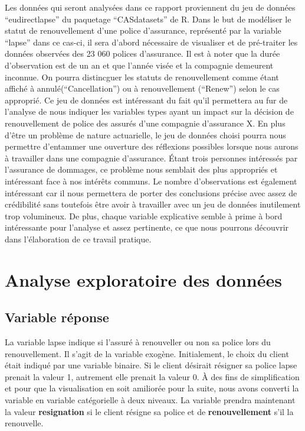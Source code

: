 \documentclass[
]{article}
\begin{document}
Les données qui seront analysées dans ce rapport proviennent du jeu de
données ``eudirectlapse'' du paquetage ``CASdatasets'' de R. Dans le but
de modéliser le statut de renouvellement d'une police d'assurance,
représenté par la variable ``lapse'' dans ce cas-ci, il sera d'abord
nécessaire de visualiser et de pré-traiter les données observées des 23
060 polices d'assurance. Il est à noter que la durée d'observation est
de un an et que l'année visée et la compagnie demeurent inconnue. On
pourra distincguer les statuts de renouvellement comme étant affiché à
annulé(``Cancellation'') ou à renouvellement (``Renew'') selon le cas
approprié. Ce jeu de données est intéressant du fait qu'il permettera au
fur de l'analyse de nous indiquer les variables types ayant un impact
sur la décision de renouvellement de police des assurés d'une compagnie
d'assurance X. En plus d'être un problème de nature actuarielle, le jeu
de données choisi pourra nous permettre d'entammer une ouverture des
réflexions possibles lorsque nous aurons à travailler dans une compagnie
d'assurance. Étant trois personnes intéressés par l'assurance de
dommages, ce problème nous semblait des plus appropriés et intéressant
face à nos intérêts communs. Le nombre d'observations est également
intéressant car il nous permettera de porter des conclusions précise
avec assez de crédibilité sans toutefois être avoir à travailler avec un
jeu de données inutilement trop volumineux. De plus, chaque variable
explicative semble à prime à bord intéressante pour l'analyse et assez
pertinente, ce que nous pourrons découvrir dans l'élaboration de ce
travail pratique.

\newpage

\hypertarget{analyse-exploratoire-des-donnuxe9es}{%
\section{Analyse exploratoire des
données}\label{analyse-exploratoire-des-donnuxe9es}}

\hypertarget{variable-ruxe9ponse}{%
\subsection{Variable réponse}\label{variable-ruxe9ponse}}

La variable lapse indique si l'assuré à renouveller ou non sa police
lors du renouvellement. Il s'agit de la variable exogène. Initialement,
le choix du client était indiqué par une variable binaire. Si le client
désirait résigner sa police lapse prenait la valeur 1, autrement elle
prenait la valeur 0. À des fins de simplification et pour que la
visualisation en soit amiliorée pour la suite, nous avons converti la
variable en variable catégorielle à deux niveaux. La variable prendra
maintenant la valeur \textbf{resignation} si le client résigne sa police
et de \textbf{renouvellement} s'il la renouvelle.
\end{document}
